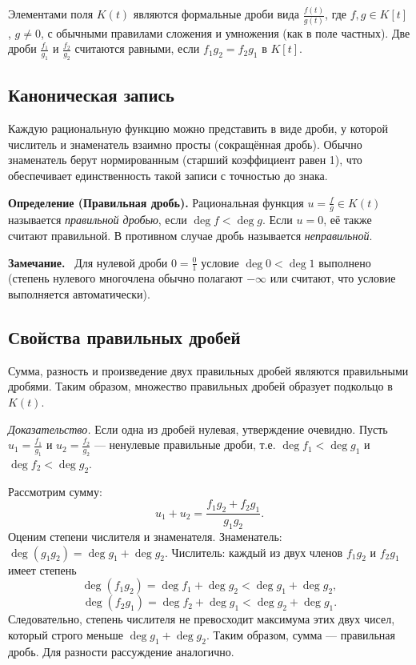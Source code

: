 \documentclass[a4paper,12pt]{article}
\newcommand{\myremark}{\textbf{Замечание.}\ }
\theoremstyle{definition}
\theoremstyle{plain}
\theoremstyle{remark}
\begin{document}
	Элементами поля \( K(t) \) являются формальные дроби вида \( \frac{f(t)}{g(t)} \), где \( f, g \in K[t] \), \( g \neq 0 \), с обычными правилами сложения и умножения (как в поле частных). Две дроби \( \frac{f_1}{g_1} \) и \( \frac{f_2}{g_2} \) считаются равными, если \( f_1 g_2 = f_2 g_1 \) в \( K[t] \).
	
	\subsection{Каноническая запись}
	
	Каждую рациональную функцию можно представить в виде дроби, у которой числитель и знаменатель взаимно просты (сокращённая дробь). Обычно знаменатель берут нормированным (старший коэффициент равен 1), что обеспечивает единственность такой записи с точностью до знака.
	
	\medskip
	\noindent \textbf{Определение (Правильная дробь).}
	Рациональная функция \( u = \frac{f}{g} \in K(t) \) называется \textit{правильной дробью}, если \( \deg f < \deg g \). Если \( u = 0 \), её также считают правильной. В противном случае дробь называется \textit{неправильной}.
	
	\myremark
	Для нулевой дроби \( 0 = \frac{0}{1} \) условие \( \deg 0 < \deg 1 \) выполнено (степень нулевого многочлена обычно полагают \( -\infty \) или считают, что условие выполняется автоматически).
	
	\subsection{Свойства правильных дробей}
	
	\begin{tcolorbox}[colback=green!5, colframe=green!50!black, title=Свойство 1]
		Сумма, разность и произведение двух правильных дробей являются правильными дробями. Таким образом, множество правильных дробей образует подкольцо в \( K(t) \).
	\end{tcolorbox}
	
	\medskip
	\textit{Доказательство.}
	Если одна из дробей нулевая, утверждение очевидно. Пусть \( u_1 = \frac{f_1}{g_1} \) и \( u_2 = \frac{f_2}{g_2} \) — ненулевые правильные дроби, т.е. \( \deg f_1 < \deg g_1 \) и \( \deg f_2 < \deg g_2 \).
	
	Рассмотрим сумму:
	\[
	u_1 + u_2 = \frac{f_1 g_2 + f_2 g_1}{g_1 g_2}.
	\]
	Оценим степени числителя и знаменателя. Знаменатель: \( \deg(g_1 g_2) = \deg g_1 + \deg g_2 \). Числитель: каждый из двух членов \( f_1 g_2 \) и \( f_2 g_1 \) имеет степень
	\[
	\deg(f_1 g_2) = \deg f_1 + \deg g_2 < \deg g_1 + \deg g_2,
	\]
	\[
	\deg(f_2 g_1) = \deg f_2 + \deg g_1 < \deg g_2 + \deg g_1.
	\]
	Следовательно, степень числителя не превосходит максимума этих двух чисел, который строго меньше \( \deg g_1 + \deg g_2 \). Таким образом, сумма — правильная дробь. Для разности рассуждение аналогично.
	
\end{document}
